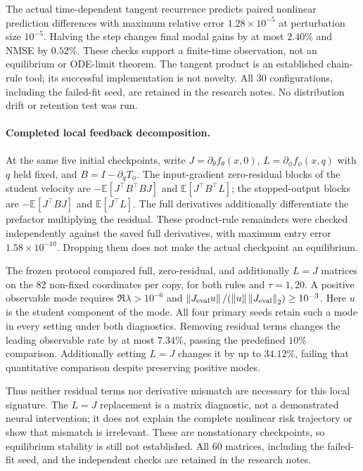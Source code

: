 \documentclass[11pt,a4paper]{article}
\newcommand{\E}{\mathbb{E}}
\newcommand{\norm}[1]{\left\lVert #1\right\rVert}
\begin{document}
The actual time-dependent tangent recurrence predicts paired nonlinear
prediction differences with maximum relative error $1.28\times10^{-5}$
at perturbation size $10^{-5}$. Halving the step changes final modal gains
by at most $2.40\%$ and NMSE by $0.52\%$. These checks support a finite-time
observation, not an equilibrium or ODE-limit theorem. The tangent product
is an established chain-rule tool; its successful implementation is not
novelty. All 30 configurations, including the failed-fit seed, are retained
in the research notes. No distribution drift or retention test was run.

\paragraph{Completed local feedback decomposition.}
At the same five initial checkpoints, write
$J=\partial_\theta f_\theta(x,0)$,
$L=\partial_\phi f_\phi(x,q)$ with $q$ held fixed, and
$B=I-\partial_qT_\phi$. The input-gradient zero-residual blocks of
the student velocity are $-\E[J^\top B^\top BJ]$ and
$\E[J^\top B^\top L]$; the stopped-output blocks are
$-\E[J^\top BJ]$ and $\E[J^\top L]$.
The full derivatives additionally differentiate the prefactor multiplying
the residual. These product-rule remainders were checked independently
against the saved full derivatives, with maximum entry error
$1.58\times10^{-10}$. Dropping them does not make the actual checkpoint
an equilibrium.

The frozen protocol compared full, zero-residual, and additionally
$L=J$ matrices on the 82 non-fixed coordinates per copy, for both rules
and $\tau=1,20$. A positive observable mode requires
$\Re\lambda>10^{-6}$ and
$\norm{J_{\rm eval}u}/(\norm{u}\norm{J_{\rm eval}}_2)\ge10^{-3}$.
Here $u$ is the student component of the mode.
All four primary seeds retain such a mode in every setting under both
diagnostics. Removing residual terms changes the leading observable rate
by at most $7.34\%$, passing the predefined $10\%$ comparison.
Additionally setting $L=J$ changes it by up to $34.12\%$, failing that
quantitative comparison despite preserving positive modes.

Thus neither residual terms nor derivative mismatch are necessary for
this local signature. The $L=J$ replacement is a matrix diagnostic, not
a demonstrated neural intervention; it does not explain the complete
nonlinear risk trajectory or show that mismatch is irrelevant. These
are nonstationary checkpoints, so equilibrium stability is still not
established. All 60 matrices, including the failed-fit seed, and the
independent checks are retained in the research notes.
\end{document}
